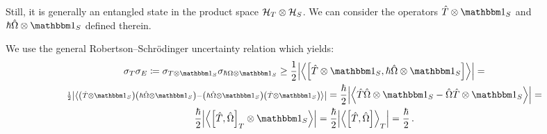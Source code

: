 %
%
%
%

Still, it is generally an entangled state in the product space $\mathcal{H}_T \otimes \mathcal{H}_S$.
We can consider the
operators $\op{T} \ox \idop_{S}$ and $\hbar\op{\Omega} \ox \idop_{S}$
defined therein.

We use the general Robertson--Schr\"{o}dinger uncertainty relation which yields:
\begin{multline}
  \sigma_T \sigma_E \eqbydef
  \sigma_{T \ox \idop_S} \sigma_{\hbar\Omega \ox \idop_S} \geq
  \frac{1}{2} \abs{\expval{\comm
    {\op{T}\ox\idop_S} {\hbar\op{\Omega}\ox\idop_S}
  }} =
  \\
  {\scriptstyle
    \frac{1}{2} \abs{\expval{
      \qty(\op{T}\ox\idop_S) \qty(\hbar\op{\Omega}\ox\idop_S) -
      \qty(\hbar\op{\Omega}\ox\idop_S) \qty(\op{T}\ox\idop_S)
    }}
  } =
  \frac{\hbar}{2} \abs{\expval{
    \op{T}\op{\Omega}\ox\idop_S - \op{\Omega}\op{T}\ox\idop_S
  }} = \\
  \frac{\hbar}{2} \abs{\expval{
    \comm{\op{T}}{\op{\Omega}}_T \ox \idop_S
  }} =
  \frac{\hbar}{2} \abs{\expval{\comm
    {\op{T}}{\op{\Omega}}
  }_T} =
  \frac{\hbar}{2}
  \,\text{.}
\end{multline}

